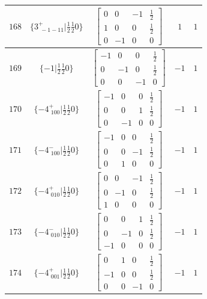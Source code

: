 \documentclass[fleqn,8pt]{jsarticle}
\begin{document}
\begin{longtable}{ccccc}
$ 168 $ & $ \{3^{+}_{\,\,-1-11}|\frac{1}{2} \frac{1}{2} 0\} $ & $ \begin{bmatrix} 0 & 0 & -1 & \frac{1}{2} \\ 1 & 0 & 0 & \frac{1}{2} \\ 0 & -1 & 0 & 0 \end{bmatrix} $ & $ 1 $ & $ 1 $ \\ \hline
$ 169 $ & $ \{-1|\frac{1}{2} \frac{1}{2} 0\} $ & $ \begin{bmatrix} -1 & 0 & 0 & \frac{1}{2} \\ 0 & -1 & 0 & \frac{1}{2} \\ 0 & 0 & -1 & 0 \end{bmatrix} $ & $ -1 $ & $ 1 $ \\ \hline
$ 170 $ & $ \{-4^{+}_{\,\,100}|\frac{1}{2} \frac{1}{2} 0\} $ & $ \begin{bmatrix} -1 & 0 & 0 & \frac{1}{2} \\ 0 & 0 & 1 & \frac{1}{2} \\ 0 & -1 & 0 & 0 \end{bmatrix} $ & $ -1 $ & $ 1 $ \\ \hline
$ 171 $ & $ \{-4^{-}_{\,\,100}|\frac{1}{2} \frac{1}{2} 0\} $ & $ \begin{bmatrix} -1 & 0 & 0 & \frac{1}{2} \\ 0 & 0 & -1 & \frac{1}{2} \\ 0 & 1 & 0 & 0 \end{bmatrix} $ & $ -1 $ & $ 1 $ \\ \hline
$ 172 $ & $ \{-4^{+}_{\,\,010}|\frac{1}{2} \frac{1}{2} 0\} $ & $ \begin{bmatrix} 0 & 0 & -1 & \frac{1}{2} \\ 0 & -1 & 0 & \frac{1}{2} \\ 1 & 0 & 0 & 0 \end{bmatrix} $ & $ -1 $ & $ 1 $ \\ \hline
$ 173 $ & $ \{-4^{-}_{\,\,010}|\frac{1}{2} \frac{1}{2} 0\} $ & $ \begin{bmatrix} 0 & 0 & 1 & \frac{1}{2} \\ 0 & -1 & 0 & \frac{1}{2} \\ -1 & 0 & 0 & 0 \end{bmatrix} $ & $ -1 $ & $ 1 $ \\ \hline
$ 174 $ & $ \{-4^{+}_{\,\,001}|\frac{1}{2} \frac{1}{2} 0\} $ & $ \begin{bmatrix} 0 & 1 & 0 & \frac{1}{2} \\ -1 & 0 & 0 & \frac{1}{2} \\ 0 & 0 & -1 & 0 \end{bmatrix} $ & $ -1 $ & $ 1 $ \\ \hline

\end{longtable}
\end{document}
